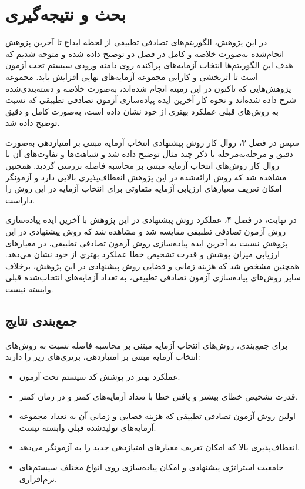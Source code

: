 \chapter{بحث و نتیجه‌گیری}\label{chapter5}

در این پژوهش، الگوریتم‌های تصادفی تطبیقی از لحظه ابداع تا آخرین پژوهش انجام‌شده به‌صورت خلاصه و کامل در فصل دو توضیح داده شده و متوجه شدیم که هدف این الگوریتم‌ها انتخاب آزمایه‌های پراکنده روی دامنه ورودی سیستم تحت آزمون است تا اثربخشی و کارایی مجموعه آزمایه‌های نهایی افزایش یابد.
مجموعه پژوهش‌هایی که تاکنون در این زمینه انجام شده‌اند، به‌صورت خلاصه و دسته‌بندی‌شده شرح داده شده‌اند و نحوه کار آخرین ایده پیاده‌سازی آزمون تصادفی تطبیقی که نسبت به روش‌های قبلی عملکرد بهتری از خود نشان داده است، به‌صورت کامل و دقیق توضیح داده شد.

سپس در فصل ۳، روال کار روش پیشنهادی انتخاب آزمایه مبتنی بر امتیازدهی به‌صورت دقیق و مرحله‌به‌مرحله با ذکر چند مثال توضیح داده شد و شباهت‌ها و تفاوت‌های آن با روال کار روش‌های انتخاب آزمایه مبتنی بر محاسبه فاصله بررسی گردید.
همچنین مشاهده شد که روش ارائه‌شده در این پژوهش انعطاف‌پذیری بالایی دارد و آزمونگر امکان تعریف معیارهای ارزیابی آزمایه متفاوتی برای انتخاب آزمایه در این روش را داراست.

در نهایت، در فصل ۴، عملکرد روش پیشنهادی در این پژوهش با آخرین ایده پیاده‌سازی روش آزمون تصادفی تطبیقی مقایسه شد و مشاهده شد که روش پیشنهادی در این پژوهش نسبت به آخرین ایده پیاده‌سازی روش آزمون تصادفی تطبیقی، در معیارهای ارزیابی میزان پوشش و قدرت تشخیص خطا عملکرد بهتری از خود نشان می‌دهد. همچنین مشخص شد که هزینه زمانی و فضایی روش پیشنهادی در این پژوهش، برخلاف سایر روش‌های پیاده‌سازی آزمون تصادفی تطبیقی، به تعداد آزمایه‌های انتخاب‌شده قبلی وابسته نیست.
\section{جمع‌بندی نتایج}

برای جمع‌بندی، روش‌های انتخاب آزمایه مبتنی بر محاسبه فاصله نسبت به روش‌های انتخاب آزمایه مبتنی بر امتیازدهی، برتری‌های زیر را دارند:

\begin{itemize}
	
	\item[\checkmark] عملکرد بهتر در پوشش کد سیستم تحت آزمون.
	\item[\checkmark] قدرت تشخیص خطای بیشتر و یافتن خطا با تعداد آزمایه‌های کمتر و در زمان کمتر.
	\item[\checkmark] اولین روش آزمون تصادفی تطبیقی که هزینه فضایی و زمانی آن به تعداد مجموعه آزمایه‌های تولیدشده قبلی وابسته نیست.
	\item[\checkmark] انعطاف‌پذیری بالا که امکان تعریف معیارهای امتیازدهی جدید را به آزمونگر می‌دهد.
	\item[\checkmark] جامعیت استراتژی پیشنهادی و امکان پیاده‌سازی روی انواع مختلف سیستم‌های نرم‌افزاری.

\end{itemize}

